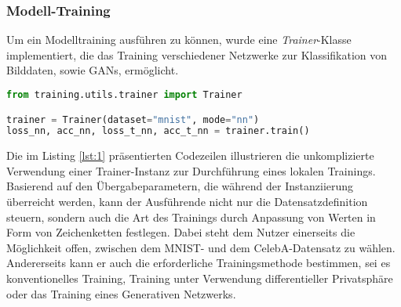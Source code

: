 \subsubsection{Modell-Training}
Um ein Modelltraining ausführen zu können, wurde eine \textit{Trainer}-Klasse implementiert, die das Training verschiedener Netzwerke zur Klassifikation von Bilddaten, sowie GANs, ermöglicht.
\begin{lstlisting}[language=Python, caption=Training eines neuronalen Netzwerks, label=lst:1]
from training.utils.trainer import Trainer 

trainer = Trainer(dataset="mnist", mode="nn")
loss_nn, acc_nn, loss_t_nn, acc_t_nn = trainer.train()
\end{lstlisting}
Die im Listing \ref{lst:1} präsentierten Codezeilen illustrieren die unkomplizierte Verwendung einer Trainer-Instanz zur Durchführung eines lokalen Trainings. Basierend auf den Übergabeparametern, die während der Instanziierung überreicht werden, kann der Ausführende nicht nur die Datensatzdefinition steuern, sondern auch die Art des Trainings durch Anpassung von Werten in Form von Zeichenketten festlegen. Dabei steht dem Nutzer einerseits die Möglichkeit offen, zwischen dem MNIST- und dem CelebA-Datensatz zu wählen. Andererseits kann er auch die erforderliche Trainingsmethode bestimmen, sei es konventionelles Training, Training unter Verwendung differentieller Privatsphäre oder das Training eines Generativen Netzwerks.